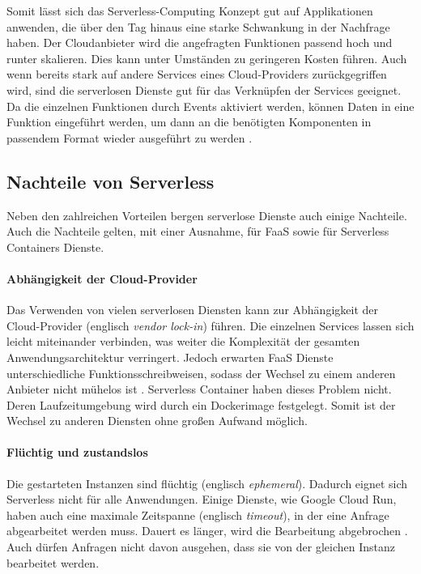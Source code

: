 Somit lässt sich das Serverless-Computing Konzept gut auf Applikationen anwenden,
die über den Tag hinaus eine starke Schwankung in der Nachfrage haben. Der Cloudanbieter wird
die angefragten Funktionen passend hoch und runter skalieren.
Dies kann unter Umständen zu geringeren Kosten führen.
Auch wenn bereits stark auf andere Services eines Cloud-Providers
zurückgegriffen wird, sind die serverlosen Dienste
gut für das Verknüpfen der Services geeignet. Da die einzelnen Funktionen durch Events
aktiviert werden, können Daten in eine Funktion eingeführt werden, um
dann an die benötigten Komponenten in passendem Format wieder ausgeführt zu werden
\cite{ServerlessTrends} \cite{HpcServerless}.

\subsection{Nachteile von Serverless}
Neben den zahlreichen Vorteilen bergen serverlose Dienste auch einige Nachteile.
Auch die Nachteile gelten, mit einer Ausnahme, für FaaS sowie für
Serverless Containers Dienste.

\paragraph{Abhängigkeit der Cloud-Provider} Das Verwenden von vielen serverlosen Diensten kann zur Abhängigkeit der
Cloud-Provider (englisch \emph{vendor lock-in}) führen. Die einzelnen
Services lassen sich leicht miteinander verbinden,
was weiter die Komplexität der gesamten Anwendungsarchitektur verringert. Jedoch erwarten
FaaS Dienste unterschiedliche Funktionsschreibweisen, sodass der Wechsel zu einem
anderen Anbieter nicht mühelos ist \cite{EcoArc}.
Serverless Container haben dieses Problem nicht.
Deren Laufzeitumgebung wird durch ein Dockerimage festgelegt.
Somit ist der Wechsel zu anderen Diensten ohne großen Aufwand
möglich.

\paragraph{Flüchtig und zustandslos} Die gestarteten Instanzen sind flüchtig (englisch \emph{ephemeral}). Dadurch
eignet sich Serverless nicht für alle Anwendungen. Einige Dienste, wie Google Cloud Run,
haben auch eine maximale Zeitspanne (englisch \emph{timeout}), in der eine Anfrage abgearbeitet werden muss.
Dauert es länger, wird die Bearbeitung abgebrochen \cite{CloudRunTimeout}.
Auch dürfen Anfragen nicht davon ausgehen, dass sie von der
gleichen Instanz bearbeitet werden.

